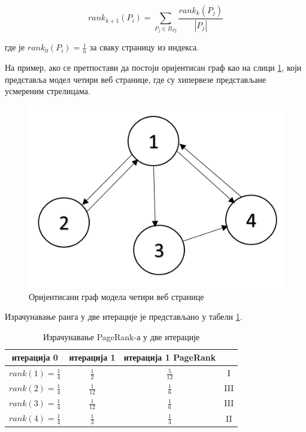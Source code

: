 \begin{equation}\label{eq:rank2}
rank_{k+1}(P_{i})=\sum_{P_{j}\in B_{P{j}}}\frac{rank_{k}(P_{j})}{\left |P_{j}  \right |}
\end{equation}

где је $rank_{0}(P_{i})=\frac{1}{n}$ за сваку страницу из индекса.

На пример, ако се претпостави да постоји оријентисан граф као
на слици \ref{slike:graf}, који представља модел четири веб странице, где су
хипервезе представљане усмереним стрелицама.

\begin{figure}[here]
\centering
\includegraphics[scale=0.6]{graf.png}
\caption{Оријентисани граф модела четири веб странице}
\label{slike:graf}
\end{figure}

Израчунавање ранга у две итерације је представљано у табели \ref{tabele:rank}.

\begin{table}[h]
\centering
\def\arraystretch{1.5}
\begin{tabular}{|c|c|c|c|}\hline
\textbf{итерација 0} & \textbf{итерација 1} & \textbf{итерација 1} \textbf{PageRank}\\ \hline\hline
$rank(1)=\frac{1}{4}$ & $\frac{1}{2}$ & $\frac{5}{12}$ & \textrm{I} \\ \hline
$rank(2)=\frac{1}{4}$ & $\frac{1}{12}$ & $\frac{1}{6}$ & \textrm{III} \\ \hline
$rank(3)=\frac{1}{4}$ & $\frac{1}{12}$ & $\frac{1}{6}$ & \textrm{III} \\ \hline
$rank(4)=\frac{1}{4}$ & $\frac{1}{3}$ & $\frac{1}{4}$ &  \textrm{II}\\ \hline
\end{tabular}
\caption{Израчунавање PageRank-а у две итерације}
\label{tabele:rank}
\end{table}

